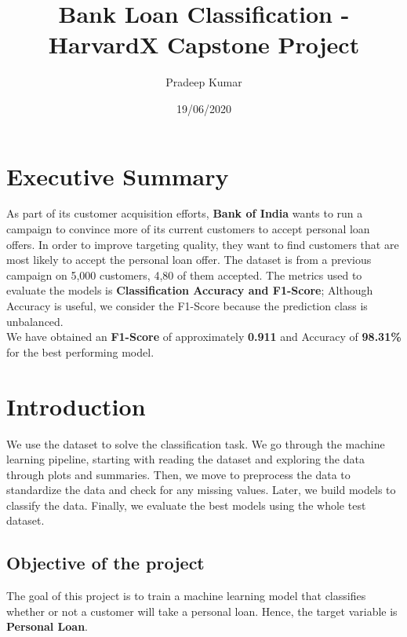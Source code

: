 \documentclass[
]{article}
\title{Bank Loan Classification - HarvardX Capstone Project}
\author{Pradeep Kumar}
\date{19/06/2020}
\begin{document}
\maketitle

{
\setcounter{tocdepth}{2}
\tableofcontents
}
\hypertarget{executive-summary}{%
\section{Executive Summary}\label{executive-summary}}

As part of its customer acquisition efforts, \textbf{Bank of India}
wants to run a campaign to convince more of its current customers to
accept personal loan offers. In order to improve targeting quality, they
want to find customers that are most likely to accept the personal loan
offer. The dataset is from a previous campaign on 5,000 customers, 4,80
of them accepted. The metrics used to evaluate the models is
\textbf{Classification Accuracy and F1-Score}; Although Accuracy is
useful, we consider the F1-Score because the prediction class is
unbalanced.\\
We have obtained an \textbf{F1-Score} of approximately \textbf{0.911}
and Accuracy of \textbf{98.31\%} for the best performing model.

\pagebreak

\hypertarget{introduction}{%
\section{Introduction}\label{introduction}}

We use the dataset to solve the classification task. We go through the
machine learning pipeline, starting with reading the dataset and
exploring the data through plots and summaries. Then, we move to
preprocess the data to standardize the data and check for any missing
values. Later, we build models to classify the data. Finally, we
evaluate the best models using the whole test dataset.

\hypertarget{objective-of-the-project}{%
\subsection{Objective of the project}\label{objective-of-the-project}}

The goal of this project is to train a machine learning model that
classifies whether or not a customer will take a personal loan. Hence,
the target variable is \textbf{Personal Loan}.
\end{document}

